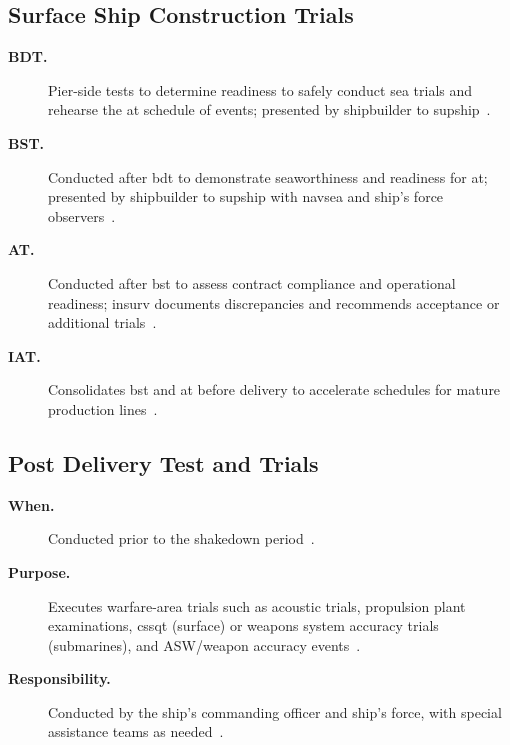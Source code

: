 \documentclass[../main.tex]{subfiles}
\begin{document}
\subsection{Surface Ship Construction Trials}
\begin{description}
  \item[\textbf{BDT.}] Pier-side tests to determine readiness to safely conduct sea trials and rehearse the \ac{at} schedule of events; presented by shipbuilder to \ac{supship}~\autocite{edo-3-5-7-ship-trials-2025}.
  \item[\textbf{BST.}] Conducted after \ac{bdt} to demonstrate seaworthiness and readiness for \ac{at}; presented by shipbuilder to \ac{supship} with \ac{navsea} and ship's force observers~\autocite{edo-3-5-7-ship-trials-2025}.
  \item[\textbf{AT.}] Conducted after \ac{bst} to assess contract compliance and operational readiness; \ac{insurv} documents discrepancies and recommends acceptance or additional trials~\autocite{edo-3-5-7-ship-trials-2025}.
  \item[\textbf{IAT.}] Consolidates \ac{bst} and \ac{at} before delivery to accelerate schedules for mature production lines~\autocite{edo-3-5-7-ship-trials-2025}.
\end{description}

\subsection{Post Delivery Test and Trials}
\begin{description}
  \item[\textbf{When.}] Conducted prior to the shakedown period~\autocite{edo-3-5-7-ship-trials-2025}.
  \item[\textbf{Purpose.}] Executes warfare-area trials such as acoustic trials, propulsion plant examinations, \ac{cssqt} (surface) or weapons system accuracy trials (submarines), and ASW/weapon accuracy events~\autocite{edo-3-5-7-ship-trials-2025}.
  \item[\textbf{Responsibility.}] Conducted by the ship's commanding officer and ship's force, with special assistance teams as needed~\autocite{edo-3-5-7-ship-trials-2025}.
\end{description}
\end{document}
